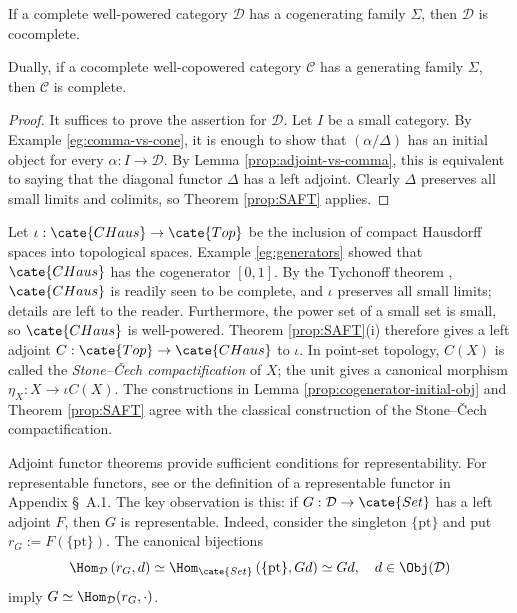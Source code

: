 \begin{corollary}\label{prop:SAFT-completeness}
	If a complete well-powered category $\mathcal{D}$ has a cogenerating family
	$\Sigma$, then $\mathcal{D}$ is cocomplete.

	Dually, if a cocomplete well-copowered category $\mathcal{C}$ has a
	generating family $\Sigma$, then $\mathcal{C}$ is complete.
\end{corollary}
\begin{proof}
	It suffices to prove the assertion for $\mathcal{D}$. Let $I$ be a small
	category. By Example \ref{eg:comma-vs-cone}, it is enough to show that
	$(\alpha/\Delta)$ has an initial object for every
	$\alpha:I\to\mathcal{D}$. By Lemma \ref{prop:adjoint-vs-comma}, this is
	equivalent to saying that the diagonal functor $\Delta$ has a left adjoint.
	Clearly $\Delta$ preserves all small limits and colimits, so Theorem
	\ref{prop:SAFT} applies.
\end{proof}

\begin{example}
	Let $\iota:\cate{CHaus}\to\cate{Top}$ be the inclusion of compact Hausdorff
	spaces into topological spaces. Example \ref{eg:generators} showed that
	$\cate{CHaus}$ has the cogenerator $[0,1]$. By the Tychonoff theorem
	\cite[Theorem 7.7.2]{Xiong}, $\cate{CHaus}$ is readily seen to be complete,
	and $\iota$ preserves all small limits; details are left to the reader.
	Furthermore, the power set of a small set is small, so $\cate{CHaus}$ is
	well-powered. Theorem \ref{prop:SAFT}(i) therefore gives a left adjoint
	$C:\cate{Top}\to\cate{CHaus}$ to $\iota$. In point-set topology, $C(X)$
	is called the \emph{Stone--\v{C}ech compactification} of $X$; the unit gives
	a canonical morphism $\eta_X:X\to\iota C(X)$. The constructions in Lemma
	\ref{prop:cogenerator-initial-obj} and Theorem \ref{prop:SAFT} agree with
	the classical construction of the Stone--\v{C}ech compactification.
\end{example}

Adjoint functor theorems provide sufficient conditions for representability.
For representable functors, see \cite[Definition 2.5.2]{Li1} or the definition
of a representable functor in Appendix \S~A.1. The key observation is this: if
$G:\mathcal{D}\to\cate{Set}$ has a left adjoint $F$, then $G$ is
representable. Indeed, consider the singleton $\{\mathrm{pt}\}$ and put
$r_G:=F(\{\mathrm{pt}\})$. The canonical bijections
\[ \Hom_{\mathcal{D}}\left( r_G, d \right) \simeq \Hom_{\cate{Set}}\left( \{\mathrm{pt}\}, Gd \right) \simeq Gd , \quad d \in \Obj(\mathcal{D}) \]
imply $G\simeq\Hom_{\mathcal{D}}(r_G,\cdot)$.

